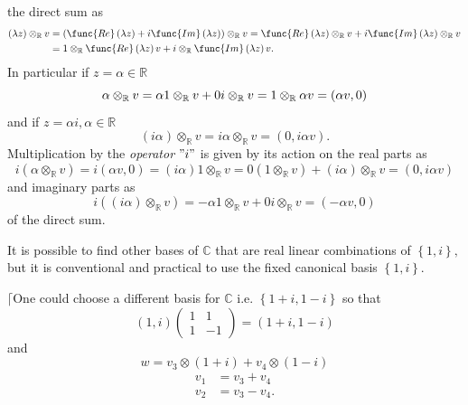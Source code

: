 \documentclass[aps,preprint]{revtex4}
\begin{document}
the direct sum as 
\begin{align}
\left( \lambda z\right) \otimes_{\mathbb{R}}v & =\left( \func{Re}\left(
\lambda z\right) +i\func{Im}\left( \lambda z\right) \right) \otimes_{\mathbb{%
R}}v=\func{Re}\left( \lambda z\right) \otimes_{\mathbb{R}}v+i\func{Im}\left(
\lambda z\right) \otimes_{\mathbb{R}}v \\
& =1\otimes_{\mathbb{R}}\func{Re}\left( \lambda z\right) v+i\otimes_{\mathbb{%
R}}\func{Im}\left( \lambda z\right) v.
\end{align}
In particular if $z=\alpha\in\mathbb{R}$ 
\begin{equation}
\alpha\otimes_{\mathbb{R}}v=\alpha1\otimes_{\mathbb{R}}v+0i\otimes _{\mathbb{%
R}}v=1\otimes_{\mathbb{R}}\alpha v=\left( \alpha v,0\right)
\end{equation}
and if $z=\alpha i,\alpha\in\mathbb{R}$%
\begin{equation}
\left( i\alpha\right) \otimes_{\mathbb{R}}v=i\alpha\otimes_{\mathbb{R}%
}v=\left( 0,i\alpha v\right) .
\end{equation}
Multiplication by the \emph{operator} $"i"$ is given by its action on the
real parts as 
\begin{equation}
i\left( \alpha\otimes_{\mathbb{R}}v\right) =i\left( \alpha v,0\right)
=\left( i\alpha\right) 1\otimes_{\mathbb{R}}v=0\left( 1\otimes_{\mathbb{R}%
}v\right) +\left( i\alpha\right) \otimes_{\mathbb{R}}v=\left( 0,i\alpha
v\right)
\end{equation}
and imaginary parts as 
\begin{equation}
i\left( \left( i\alpha\right) \otimes_{\mathbb{R}}v\right) =-\alpha
1\otimes_{\mathbb{R}}v+0i\otimes_{\mathbb{R}}v=\left( -\alpha v,0\right)
\end{equation}
of the direct sum.

It is possible to find other bases of $\mathbb{C}$ that are real linear
combinations of $\left\{ 1,i\right\} ,$ but it is conventional and practical
to use the fixed canonical basis $\left\{ 1,i\right\} .$

$\lceil$One could choose a different basis for $\mathbb{C}$ i.e. $\left\{
1+i,1-i\right\} $ so that 
\begin{equation}
\left( 1,i\right) \left( 
\begin{array}{cc}
1 & 1 \\ 
1 & -1%
\end{array}
\right) =\left( 1+i,1-i\right)
\end{equation}
and 
\begin{equation}
w=v_{3}\otimes\left( 1+i\right) +v_{4}\otimes\left( 1-i\right)
\end{equation}%
\begin{align}
v_{1} & =v_{3}+v_{4} \\
v_{2} & =v_{3}-v_{4}.
\end{align}
\end{document}
